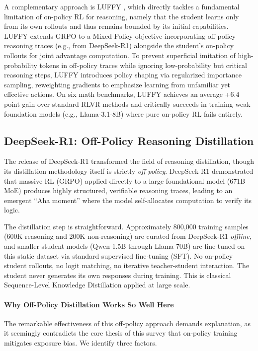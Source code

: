 \documentclass{article} %
\begin{document}
A complementary approach is LUFFY \citep{2504.14945}, which directly tackles a fundamental limitation of on-policy RL for reasoning, namely that the student learns only from its own rollouts and thus remains bounded by its initial capabilities. LUFFY extends GRPO to a Mixed-Policy objective incorporating off-policy reasoning traces (e.g., from DeepSeek-R1) alongside the student's on-policy rollouts for joint advantage computation. To prevent superficial imitation of high-probability tokens in off-policy traces while ignoring low-probability but critical reasoning steps, LUFFY introduces policy shaping via regularized importance sampling, reweighting gradients to emphasize learning from unfamiliar yet effective actions. On six math benchmarks, LUFFY achieves an average +6.4 point gain over standard RLVR methods and critically succeeds in training weak foundation models (e.g., Llama-3.1-8B) where pure on-policy RL fails entirely.

\subsection{DeepSeek-R1: Off-Policy Reasoning Distillation}
The release of DeepSeek-R1 \citep{2501.12948} transformed the field of reasoning distillation, though its distillation methodology itself is strictly \emph{off-policy}. DeepSeek-R1 demonstrated that massive RL (GRPO) applied directly to a large foundational model (671B MoE) produces highly structured, verifiable reasoning traces, leading to an emergent ``Aha moment'' where the model self-allocates computation to verify its logic.

The distillation step is straightforward. Approximately 800,000 training samples (600K reasoning and 200K non-reasoning) are curated from DeepSeek-R1 \emph{offline}, and smaller student models (Qwen-1.5B through Llama-70B) are fine-tuned on this static dataset via standard supervised fine-tuning (SFT). No on-policy student rollouts, no logit matching, no iterative teacher-student interaction. The student never generates its own responses during training. This is classical Sequence-Level Knowledge Distillation \citep{kim2016sequence} applied at large scale.

\paragraph{Why Off-Policy Distillation Works So Well Here}
The remarkable effectiveness of this off-policy approach demands explanation, as it seemingly contradicts the core thesis of this survey that on-policy training mitigates exposure bias. We identify three factors.
\end{document}
